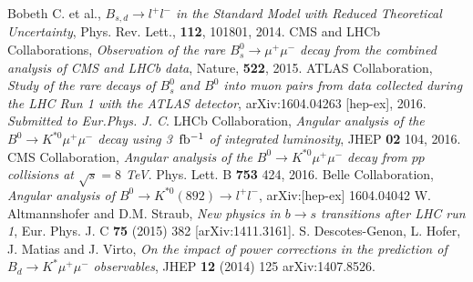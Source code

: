 \documentclass{PoS}
\begin{document}
\begin{thebibliography}{99}
 Bobeth C. et al., {\it{$B_{s,d} \to l^+ l^-$ in the Standard Model with Reduced Theoretical Uncertainty}}, Phys. Rev. Lett., {\bf{112}}, 101801, 2014.
 CMS and LHCb Collaborations, {\it{Observation of the rare $B^0_s\rightarrow\mu^+\mu^-$ decay from the combined analysis of CMS and LHCb data}}, Nature, {\bf{522}}, 2015.
 ATLAS Collaboration, {\it{Study of the rare decays of $B^0_s$ and $B^0$  into muon pairs from data collected during the LHC Run 1 with the ATLAS detector}}, arXiv:1604.04263 [hep-ex], 2016. {\it{Submitted to Eur.Phys. J. C}}.
 LHCb Collaboration, {\it{Angular analysis of the $B^0 \to K^{*0}  \mu^+ \mu^-$ decay using 3~${\rm{fb^{-1}}}$ of integrated luminosity}}, JHEP {\bf{02}} 104, 2016. 
 CMS Collaboration, {\it{Angular analysis of the $B^0 \to K^{*0}  \mu^+ \mu^-$  decay from $pp$ collisions at $\sqrt{s} = 8$ TeV}}. Phys. Lett. B {\bf{753}} 424, 2016.
 Belle Collaboration, {\it{Angular analysis of $B^0 \to K^{*0}(892) \to l^+ l^-$}}, arXiv:[hep-ex] 1604.04042
 W. Altmannshofer and D.M. Straub, {\it{New physics in $b \to s$ transitions after LHC run 1}}, Eur. Phys. J. C {\bf{75}} (2015) 382 [arXiv:1411.3161].
 S. Descotes-Genon, L. Hofer, J. Matias and J. Virto, {\it{On the impact of power corrections in the prediction of $B_d \to K^* \mu^+ \mu^-$ observables}}, JHEP {\bf{12}} (2014) 125 arXiv:1407.8526.
\end{thebibliography}
\end{document}
